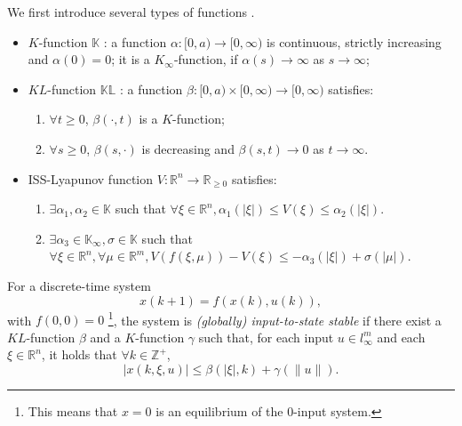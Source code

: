 We first introduce several types of functions \cite{Jiang2001857}.
\begin{itemize}
\item $ K $-function $ \mathbb{K} $ : a function $ \alpha  : [ 0, a ) \rightarrow [ 0, \infty ) $ is continuous, strictly increasing and $ \alpha (0) = 0 $; it is a $ K_{\infty} $-function, if $ \alpha (s) \rightarrow \infty $ as $ s \rightarrow \infty $;
\item $ KL $-function $ \mathbb{KL} $ : a function $ \beta : [ 0, a ) \times [ 0 , \infty ) \rightarrow [ 0, \infty ) $ satisfies:
\begin{enumerate}
\item $ \forall t \geq 0 $, $ \beta (\cdot , t ) $ is a $ K $-function;
\item $ \forall s \geq 0 $, $ \beta (s, \cdot) $ is decreasing and $ \beta(s,t) \rightarrow 0 $ as $ t \rightarrow \infty $.
\end{enumerate}
\item ISS-Lyapunov function $ V : \mathbb{R}^{n} \rightarrow \mathbb{R}_{\geq 0} $ satisfies:
\begin{enumerate}
\item $ \exists \alpha_{1}, \alpha_{2} \in \mathbb{K} $ such that 
$ \forall \xi \in \mathbb{R}^{n}, \alpha_{1} ( | \xi | ) \leq V( \xi ) \leq \alpha_{2}  ( | \xi | ) $.
\item $ \exists \alpha_{3} \in \mathbb{K}_{\infty} , \sigma \in \mathbb{K} $ such that $ \forall \xi \in \mathbb{R}^{n}, \forall \mu \in \mathbb{R}^{m}, V( f( \xi, \mu ) ) - V( \xi ) \leq - \alpha_{3} ( | \xi | ) + \sigma ( | \mu | ) $. 
\end{enumerate}
\end{itemize}

\begin{mydef}\cite{Jiang2001857}
\label{def:iss}
For a discrete-time system
\begin{equation}
\label{eq:dis_nonlinear}
x(k+1) = f( x(k) , u(k) ),
\end{equation}
with $ f(0,0) = 0 $
\footnote{This means that $ x = 0 $ is an equilibrium of the 0-input system.}, the system is \emph{(globally) input-to-state stable} if there exist a $ KL $-function $ \beta  $ and a $ K $-function $ \gamma $ such that, for each input $ u \in l^{m}_{\infty} $ and each $ \xi \in \mathbb{R}^{n} $, it holds that $  \forall k \in \mathbb{Z}^{+} $,
\begin{equation}
\label{eq:def_iss}
| x(k, \xi, u) | \leq \beta (| \xi |, k) + \gamma ( \lVert u \rVert ).
\end{equation}
\end{mydef}

